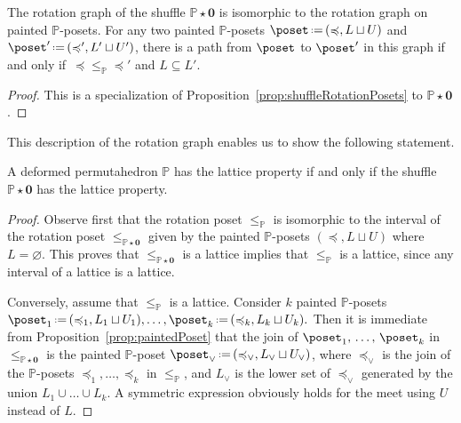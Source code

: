 \documentclass[AHL,Unicode,longabstracts,published]{cedram}
\renewcommand{\b}[1]{\boldsymbol{#1}}
\newcommand{\eqdef}{\mbox{\,\raisebox{0.2ex}{\scriptsize\ensuremath{\mathrm:}}\ensuremath{=}\,}}
\newcommand{\shuffleDP}{\star} %
\newcommand{\join}{\vee}
\newcommand{\polytope}[1]{\mathds{#1}}
\begin{document}
\begin{prop}\label{prop:paintedPoset}
The rotation graph of the shuffle $\polytope{P} \shuffleDP \b{0}$ is isomorphic to the rotation graph on painted $\polytope{P}$-posets. For any two painted $\polytope{P}$-posets $\poset \eqdef (\preccurlyeq, L \sqcup U)$ and $\poset' \eqdef (\preccurlyeq', L' \sqcup U')$, there is a path from $\poset$ to $\poset'$ in this graph if and only if~${\preccurlyeq} \le_\polytope{P} {\preccurlyeq'}$ and $L \subseteq L'$.
\end{prop}

\begin{proof}
This is a specialization of Proposition~\ref{prop:shuffleRotationPosets} to $\polytope{P} \shuffleDP \b{0}$.
\end{proof}

This description of the rotation graph enables us to show the following statement.

\begin{prop}\label{prop:latticeShufflePoint}
A deformed permutahedron $\polytope{P}$ has the lattice property if and only if the shuffle ${\polytope{P} \shuffleDP \b{0}}$ has the lattice property.
\end{prop}

\begin{proof}
Observe first that the rotation poset $\le_\polytope{P}$ is isomorphic to the interval of the rotation poset $\le_{\polytope{P} \shuffleDP \b{0}}$ given by the painted $\polytope{P}$-posets $(\preccurlyeq, L \sqcup U)$ where $L = \varnothing$. This proves that $\le_{\polytope{P} \shuffleDP \b{0}}$ is a lattice implies that $\le_\polytope{P}$ is a lattice, since any interval of a lattice is a lattice.

Conversely, assume that $\le_\polytope{P}$ is a lattice. Consider $k$ painted $\polytope{P}$-posets $\poset_1 \eqdef (\preccurlyeq_1,\linebreak L_1 \sqcup U_1), \dots, \poset_k \eqdef (\preccurlyeq_k, L_k \sqcup U_k).$
Then it is immediate from Proposition~\ref{prop:paintedPoset} that the join of $\poset_1,\,\dots, \,\poset_k$ in $\le_{\polytope{P} \shuffleDP \b{0}}$ is the painted $\polytope{P}$-poset $\poset_\join \eqdef (\preccurlyeq_\join, L_\join \sqcup U_\join)$, where $\preccurlyeq_\join$ is the join of the $\polytope{P}$-posets $\preccurlyeq_1, \dots, \preccurlyeq_k$ in $\le_\polytope{P}$, and $L_\join$ is the lower set of $\preccurlyeq_\join$ generated by the union $L_1 \cup \dots \cup L_k$. A symmetric expression obviously holds for the meet using $U$ instead of $L$.
\end{proof}
\end{document}
